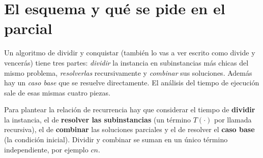 
\newcommand{\dycmas}[1]{\par\smallskip{\color{acento}\rule[0.15em]{0.9em}{1.4pt}}\hspace{0.35em}#1}


\section{El esquema y qué se pide en el parcial}

Un algoritmo de dividir y conquistar (también lo vas a ver escrito como divide y vencerás) tiene tres partes: \emph{dividir} la instancia en subinstancias más chicas del mismo problema, \emph{resolverlas} recursivamente y \emph{combinar} sus soluciones. Además hay un \emph{caso base} que se resuelve directamente. El análisis del tiempo de ejecución sale de esas mismas cuatro piezas.

\begin{resultado}
Para plantear la relación de recurrencia hay que considerar el tiempo de \textbf{dividir} la instancia, el de \textbf{resolver las subinstancias} (un término $T(\cdot)$ por llamada recursiva), el de \textbf{combinar} las soluciones parciales y el de resolver el \textbf{caso base} (la condición inicial). Dividir y combinar se suman en un único término independiente, por ejemplo $cn$.
\end{resultado}

